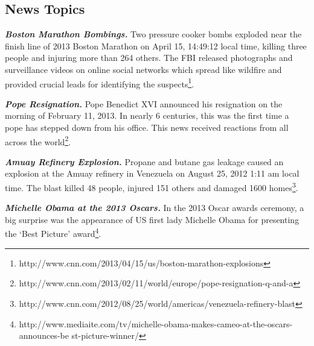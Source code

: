 
\subsection{News Topics}

\noindent
\textbf{\emph{Boston Marathon Bombings.}}
Two pressure cooker bombs exploded near the finish line of 2013 Boston Marathon on April 15, 14:49:12 local time,
killing three people and injuring more than 264 others.
The FBI released photographs and surveillance videos on online social networks which spread like wildfire and provided crucial leads for identifying the suspects\footnote{http://www.cnn.com/2013/04/15/us/boston-marathon-explosions}.

\noindent
\textbf{\emph{Pope Resignation.}}
Pope Benedict XVI announced his resignation on the morning of February 11, 2013. In nearly 6 centuries,
this was the first time a pope has stepped down from his office. This news
received reactions from all across the world\footnote{http://www.cnn.com/2013/02/11/world/europe/pope-resignation-q-and-a}.

\noindent
\textbf{\emph{Amuay Refinery Explosion.}}
Propane and butane gas leakage caused an explosion at the Amuay refinery in Venezuela on August 25, 2012 1:11 am local time. The blast killed 48 people, injured 151 others and damaged
1600 homes\footnote{http://www.cnn.com/2012/08/25/world/americas/venezuela-refinery-blast}.

\noindent
\textbf{\emph{Michelle Obama at the 2013 Oscars.}}
In the 2013 Oscar awards ceremony, a big surprise was
the appearance of US first lady Michelle Obama for presenting the `Best Picture' award\footnote{http://www.mediaite.com/tv/michelle-obama-makes-cameo-at-the-oscars-announces-be
st-picture-winner/}. %


